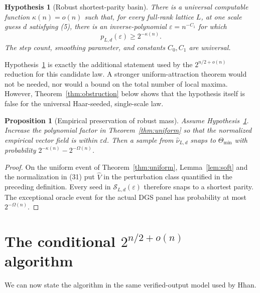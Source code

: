 \documentclass[10pt]{article}
\newtheorem{proposition}[theorem]{Proposition}
\newtheorem{hypothesis}[theorem]{Hypothesis}
\theoremstyle{definition}
\newcommand{\what}{\widehat}
\newcommand{\cS}{\mathcal{S}}
\begin{document}
\begin{hypothesis}[Robust shortest-parity basin]                   \label{hyp:basin}
There is a universal computable function $\kappa(n)=o(n)$ such that, for every
full-rank lattice $L$, at one scale guess $d$ satisfying (5), there is an
inverse-polynomial $\varepsilon=n^{-C_1}$ for which
\[
 p_{L,d}(\varepsilon)\ge2^{-\kappa(n)}.                           \tag{33}
\]
The step count, smoothing parameter, and constants $C_0,C_1$ are universal.
\end{hypothesis}

Hypothesis~\ref{hyp:basin} is exactly the additional statement used by the
$2^{n/2+o(n)}$ reduction for this candidate law.  A stronger
uniform-attraction theorem would not be needed, nor would a bound on the
total number of local maxima.  However, Theorem~\ref{thm:obstruction} below
shows that the hypothesis itself is false for the universal Haar-seeded,
single-scale law.

\begin{proposition}[Empirical preservation of robust mass]        \label{prop:preserve}
Assume Hypothesis~\ref{hyp:basin}.  Increase the polynomial factor in
Theorem~\ref{thm:uniform} so that the normalized empirical vector field is
within $\varepsilon d$.  Then a sample from
$\what\nu_{L,d}$ snaps to $\Theta_{\min}$ with probability
$2^{-\kappa(n)}-2^{-\Omega(n)}$.
\end{proposition}

\begin{proof}
On the uniform event of Theorem~\ref{thm:uniform}, Lemma~\ref{lem:soft} and
the normalization in (31) put $\what V$ in the perturbation class quantified
in the preceding definition.  Every seed in
$\cS_{L,d}(\varepsilon)$ therefore snaps to
a shortest parity.  The exceptional oracle event for the actual DGS panel has
probability at most $2^{-\Omega(n)}$.
\end{proof}

\section{The conditional \texorpdfstring{$2^{n/2+o(n)}$}{half-exponential}
algorithm}

We can now state the algorithm in the same verified-output model used by
Hhan.
\end{document}
